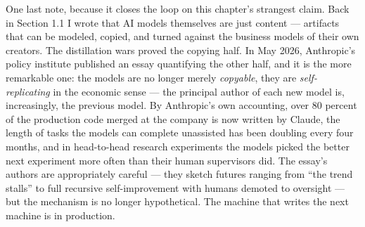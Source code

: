 One last note, because it closes the loop on this chapter's strangest claim. Back in Section 1.1 I wrote that AI models themselves are just content --- artifacts that can be modeled, copied, and turned against the business models of their own creators. The distillation wars proved the copying half. In May 2026, Anthropic's policy institute published an essay quantifying the other half, and it is the more remarkable one: the models are no longer merely \textit{copyable}, they are \textit{self-replicating} in the economic sense --- the principal author of each new model is, increasingly, the previous model. By Anthropic's own accounting, over 80 percent of the production code merged at the company is now written by Claude, the length of tasks the models can complete unassisted has been doubling every four months, and in head-to-head research experiments the models picked the better next experiment more often than their human supervisors did. The essay's authors are appropriately careful --- they sketch futures ranging from ``the trend stalls'' to full recursive self-improvement with humans demoted to oversight --- but the mechanism is no longer hypothetical. The machine that writes the next machine is in production.


